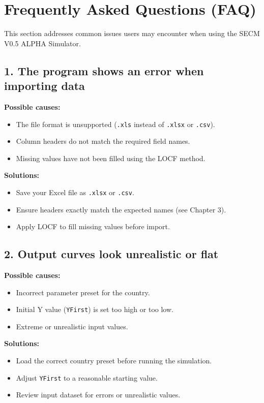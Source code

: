 \documentclass[12pt,a4paper]{article}
\begin{document}
\newpage
\section{Frequently Asked Questions (FAQ)}

This section addresses common issues users may encounter when using the SECM V0.5 ALPHA Simulator.

\subsection*{1. The program shows an error when importing data}
\textbf{Possible causes:}
\begin{itemize}
    \item The file format is unsupported (\texttt{.xls} instead of \texttt{.xlsx} or \texttt{.csv}).
    \item Column headers do not match the required field names.
    \item Missing values have not been filled using the LOCF method.
\end{itemize}
\textbf{Solutions:}
\begin{itemize}
    \item Save your Excel file as \texttt{.xlsx} or \texttt{.csv}.
    \item Ensure headers exactly match the expected names (see Chapter 3).
    \item Apply LOCF to fill missing values before import.
\end{itemize}

\subsection*{2. Output curves look unrealistic or flat}
\textbf{Possible causes:}
\begin{itemize}
    \item Incorrect parameter preset for the country.
    \item Initial Y value (\texttt{YFirst}) is set too high or too low.
    \item Extreme or unrealistic input values.
\end{itemize}
\textbf{Solutions:}
\begin{itemize}
    \item Load the correct country preset before running the simulation.
    \item Adjust \texttt{YFirst} to a reasonable starting value.
    \item Review input dataset for errors or unrealistic values.
\end{itemize}
\end{document}
